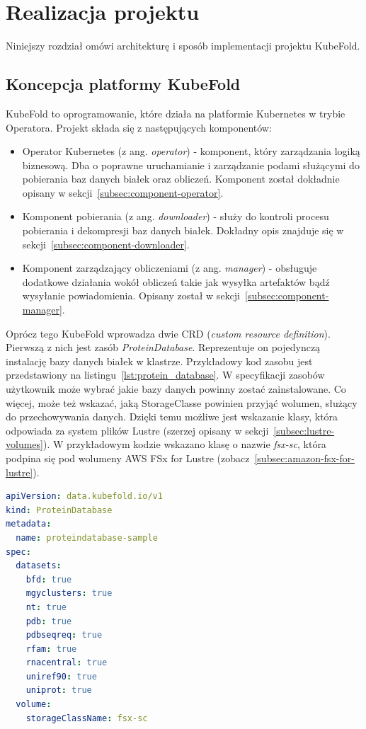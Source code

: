 \chapter{Realizacja projektu}
Niniejszy rozdział omówi architekturę i sposób implementacji projektu KubeFold.


\section{Koncepcja platformy KubeFold}
KubeFold to oprogramowanie, które działa na platformie Kubernetes w trybie Operatora.
Projekt składa się z następujących komponentów:
\begin{itemize}
    \item Operator Kubernetes (z ang. \textit{operator}) - komponent, który zarządzania logiką biznesową.
    Dba o poprawne uruchamianie i zarządzanie podami służącymi do pobierania baz danych białek oraz obliczeń.
    Komponent został dokładnie opisany w sekcji~\ref{subsec:component-operator}.
    \item Komponent pobierania (z ang. \textit{downloader}) - służy do kontroli procesu pobierania i dekompresji baz danych białek.
    Dokładny opis znajduje się w sekcji~\ref{subsec:component-downloader}.
    \item Komponent zarządzający obliczeniami (z ang. \textit{manager}) - obsługuje dodatkowe działania wokół obliczeń takie jak wysyłka artefaktów bądź wysyłanie powiadomienia.
    Opisany został w sekcji~\ref{subsec:component-manager}.
\end{itemize}

Oprócz tego KubeFold wprowadza dwie CRD (\textit{custom resource definition}). Pierwszą z nich jest zasób \textit{ProteinDatabase}.
Reprezentuje on pojedynczą instalację bazy danych białek w klastrze.
Przykładowy kod zasobu jest przedstawiony na listingu~\ref{lst:protein_database}.
W specyfikacji zasobów użytkownik może wybrać jakie bazy danych powinny zostać zainstalowane.
Co więcej, może też wskazać, jaką StorageClasse powinien przyjąć wolumen, służący do przechowywania danych.
Dzięki temu możliwe jest wskazanie klasy, która odpowiada za system plików Lustre (szerzej opisany w sekcji~\ref{subsec:lustre-volumes}).
W przykładowym kodzie wskazano klasę o nazwie \textit{fsx-sc}, która podpina się pod wolumeny AWS FSx for Lustre (zobacz~\ref{subsec:amazon-fsx-for-lustre}).

\begin{lstlisting}[language=yaml,caption={Przykładowy kod YAML zasobu ProteinDatabase},label={lst:protein_database}]
apiVersion: data.kubefold.io/v1
kind: ProteinDatabase
metadata:
  name: proteindatabase-sample
spec:
  datasets:
    bfd: true
    mgyclusters: true
    nt: true
    pdb: true
    pdbseqreq: true
    rfam: true
    rnacentral: true
    uniref90: true
    uniprot: true
  volume:
    storageClassName: fsx-sc
\end{lstlisting}

